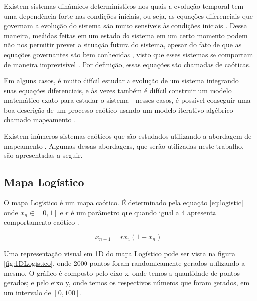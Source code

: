
Existem sistemas dinâmicos determinísticos nos quais a evolução temporal tem uma dependência forte nas condições iniciais, ou seja, as equações diferenciais que governam a evolução do sistema são muito sensíveis às condições iniciais \cite{cattani}. Dessa maneira, medidas feitas em um estado do sistema em um certo momento podem não nos permitir prever a situação futura do sistema, apesar do fato de que as equações governantes são bem conhecidas \cite{cattani}, visto que esses sistemas se comportam de maneira imprevisível \cite{fister}. Por definição, essas equações são chamadas de caóticas.

Em alguns casos, é muito difícil estudar a evolução de um sistema integrando suas equações diferenciais, e às vezes também é difícil construir um modelo matemático exato para estudar o sistema - nesses casos, é possível conseguir uma boa descrição de um processo caótico usando um modelo iterativo algébrico chamado mapeamento \cite{cattani}.

Existem inúmeros sistemas caóticos que são estudados utilizando a abordagem de mapeamento \cite{cattani}. Algumas dessas abordagens, que serão utilizadas neste trabalho, são apresentadas a seguir.

\subsection{Mapa Logístico}
O mapa Logístico é um mapa caótico. É determinado pela equação \ref{eq:logistic} onde $x_{n} \in$ $[0, 1]$ e $r$ é um parâmetro que quando igual a 4 apresenta comportamento caótico \cite{fister}.

\begin{equation}
\label{eq:logistic}
x_{n + 1} = r x_{n} (1 - x_{n})
\end{equation}

Uma representação visual em 1D do mapa Logístico pode ser vista na figura \ref{fig:1DLogistico}, onde 2000 pontos foram randomicamente gerados utilizando a mesmo. O gráfico é composto pelo eixo x, onde temos a quantidade de pontos gerados; e pelo eixo y, onde temos os respectivos números que foram gerados, em um intervalo de $[0, 100]$.

